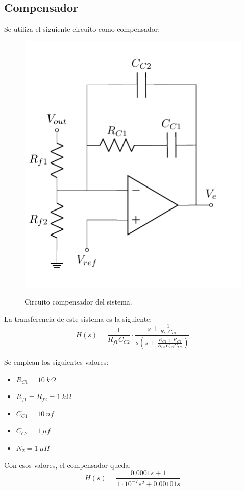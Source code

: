 \subsection{Compensador}

Se utiliza el siguiente circuito como compensador:
\begin{figure}[H]
	\centering
	\includegraphics[width=0.3\linewidth, page = 1]{ImagenesParteIII/CircuitsP3.pdf}
	\label{fig:compensador}
	\caption{Circuito compensador del sistema.}
\end{figure}

La transferencia de este sistema es la siguiente:
\begin{equation}
	H(s) = \frac{ 1 }{ R_{f1} C_{C2} } \cdot \frac{s + \frac{1}{ R_{C1} C_{C1}}}{ s \left( s + \frac{R_{C1} + R_{C2}}{R_{C1} C_{C1} C_{C2}} \right)}
\end{equation}

Se emplean los siguientes valores:
\begin{multicols}{2}
\begin{itemize}
	\item $R_{C1} = 10 \ k\Omega$
	\item $R_{f1} = R_{f2} = 1 \ k\Omega$
	\item $C_{C1} = 10 \ nf$
	\item $C_{C2} = 1 \ \mu f$
	\item $N_2 = 1 \ \mu H$
\end{itemize}
\end{multicols}

Con esos valores, el compensador queda:
\begin{equation}
	H(s) = \frac{0.0001 s + 1}{ 1 \cdot 10^{-7} s^2 + 0.00101 s }
\end{equation}

